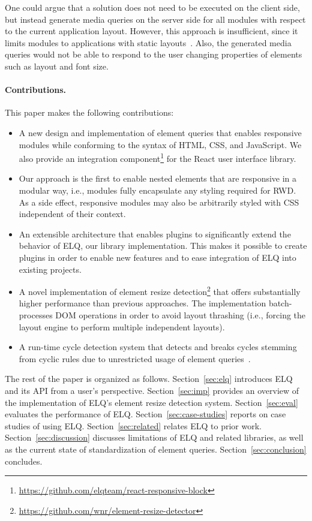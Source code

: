 \documentclass[sigplan,9pt]{acmart}
\newcommand{\elq}{ELQ}
\begin{document}
    One could argue that a solution does not need to be executed on the client side, but instead generate media queries on the server side for all modules with respect to the current application layout.
    However, this approach is insufficient, since it limits modules to applications with static layouts~\cite{elq-thesis}. Also, the generated media queries would not be able to respond to the user changing properties of elements such as layout and font size.

  \paragraph{Contributions.}
    This paper makes the following contributions:
    \begin{itemize}
      \item A new design and implementation of element queries that enables responsive modules while conforming to the syntax of HTML, CSS, and JavaScript. We also provide an integration component\footnote{\url{https://github.com/elqteam/react-responsive-block}} for the React user interface library.
      \item
        Our approach is the first to enable nested elements that are responsive in a modular way, i.e., modules fully encapsulate any styling required for RWD.
        As a side effect, responsive modules may also be arbitrarily styled with CSS independent of their context.
      \item
        An extensible architecture that enables plugins to significantly extend the behavior of ELQ, our library implementation.
        This makes it possible to create plugins in order to enable new features and to ease integration of \elq{} into existing projects.
      \item
        A novel implementation of element resize detection\footnote{\url{https://github.com/wnr/element-resize-detector}} that offers substantially higher performance than previous approaches.
        The implementation batch-processes DOM operations in order to avoid layout thrashing (i.e., forcing the layout engine to perform multiple independent layouts).
      \item
        A run-time cycle detection system that detects and breaks cycles stemming from cyclic rules due to unrestricted usage of element queries~\cite{elq-thesis}.
    \end{itemize}

  The rest of the paper is organized as follows.
  Section~\ref{sec:elq} introduces \elq{} and its API from a user's perspective.
  Section~\ref{sec:imp} provides an overview of the implementation of \elq{}'s element resize detection system.
  Section~\ref{sec:eval} evaluates the performance of \elq{}.
  Section~\ref{sec:case-studies} reports on case studies of using \elq{}.
  Section~\ref{sec:related} relates \elq{} to prior work.
  Section~\ref{sec:discussion} discusses limitations of \elq{} and related libraries, as well as the current state of standardization of element queries.
  Section~\ref{sec:conclusion} concludes.
\end{document}
